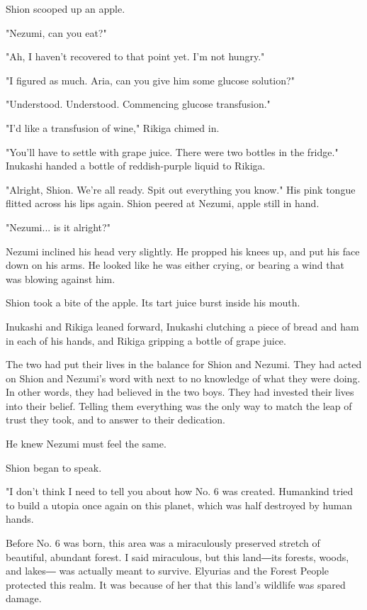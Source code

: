 Shion scooped up an apple.

"Nezumi, can you eat?"

"Ah, I haven't recovered to that point yet. I'm not hungry."

"I figured as much. Aria, can you give him some glucose solution?"

{\sffamily "Understood. Understood. Commencing glucose transfusion."}

"I'd like a transfusion of wine," Rikiga chimed in.

"You'll have to settle with grape juice. There were two bottles in the
fridge." Inukashi handed a bottle of reddish-purple liquid to Rikiga.

"Alright, Shion. We're all ready. Spit out everything you know." His
pink tongue flitted across his lips again. Shion peered at Nezumi, apple
still in hand.

"Nezumi... is it alright?"

Nezumi inclined his head very slightly. He propped his knees up, and put
his face down on his arms. He looked like he was either crying, or
bearing a wind that was blowing against him.

Shion took a bite of the apple. Its tart juice burst inside his mouth.

Inukashi and Rikiga leaned forward, Inukashi clutching a piece of bread
and ham in each of his hands, and Rikiga gripping a bottle of grape
juice.

The two had put their lives in the balance for Shion and Nezumi. They
had acted on Shion and Nezumi's word with next to no knowledge of what
they were doing. In other words, they had believed in the two boys. They
had invested their lives into their belief. Telling them everything was
the only way to match the leap of trust they took, and to answer to
their dedication.

He knew Nezumi must feel the same.

Shion began to speak.

\myspace

"I don't think I need to tell you about how No. 6 was created. Humankind
tried to build a utopia once again on this planet, which was half
destroyed by human hands.

Before No. 6 was born, this area was a miraculously preserved stretch of
beautiful, abundant forest. I said miraculous, but this land―its
forests, woods, and lakes― was actually meant to survive. Elyurias and
the Forest People protected this realm. It was because of her that this
land's wildlife was spared damage.

